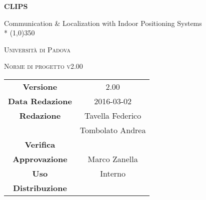 \documentclass[a4paper,12pt]{article}
\author{Tavella Federico, Tombolato Andrea}
\date{04/03/2016}
\begin{document}
\begin{titlepage}
	\centering
	{\huge\bfseries CLIPS\par}
	Communication \& Localization with Indoor Positioning Systems \\*
	\line(1,0){350} \\
	{\scshape\LARGE Università di Padova \par}
	\vspace{1cm}
	{\scshape\Large Norme di progetto v2.00 \par}
	\logo
	\newpage
		\begin{tabular}{c|c}
			{\hfill \textbf{Versione}} 			& 2.00					    \\
			{\hfill\textbf{Data Redazione}} 	& 2016-03-02		 	    \\ 
			{\hfill\textbf{Redazione}} 			&  Tavella Federico			\\ 
												&  Tombolato Andrea			\\
			{\hfill\textbf{Verifica}} 			&  		\\
			{\hfill\textbf{Approvazione}} 		&  Marco Zanella		\\
			{\hfill\textbf{Uso}} 				&  Interno					\\
			{\hfill\textbf{Distribuzione}} 		&  \leaf					\\
		\end{tabular}
	\end{titlepage}
	\newpage
	\pagestyle{myfront}
	
		\newpage
			\tableofcontents
		\newpage
			\listoffigures	
	\label{LastFrontPage}
	\newpage
	\pagestyle{mymain}
         
    \newpage
		

	\newpage
		
	
	\newpage
		
	
	\newpage
		
		
	\label{LastPage}
\end{document}
